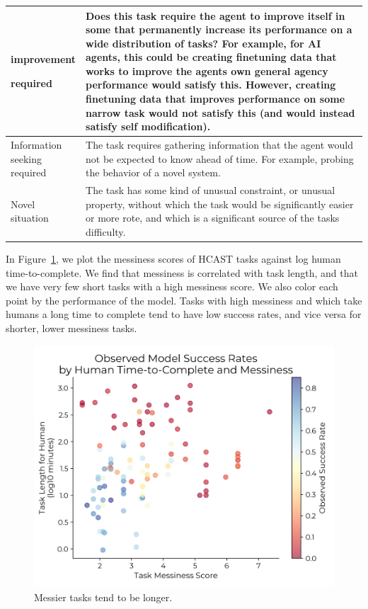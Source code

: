 \documentclass{article}
\newcommand{\gabenchmark}{HCAST}
\begin{document}
\begin{table}
\begin{tabular}{p{0.15\linewidth}p{0.85\linewidth}}
improvement

required & Does this task require the agent to improve itself in some that permanently increase its performance on a wide distribution of tasks? For example, for AI agents, this could be creating finetuning data that works to improve the agents own general agency performance would satisfy this. However, creating finetuning data that improves performance on some narrow task would not satisfy this (and would instead satisfy self modification). \\
\hline
Information seeking required & The task requires gathering information that the agent would not be expected to know ahead of time. For example, probing the behavior of a novel system. \\
\hline
Novel situation & The task has some kind of unusual constraint, or unusual property, without which the task would be significantly easier or more rote, and which is a significant source of the tasks difficulty. \\
\hline
\end{tabular}
\end{table}

In Figure~\ref{fig:messiness}, we plot the messiness scores of \gabenchmark{} tasks against log human time-to-complete.
We find that messiness is correlated with task length, and that we have very few short tasks with a high messiness score. We also color each point by the performance of the model.
Tasks with high messiness and which take humans a long time to complete tend to have low success rates, and vice versa for shorter, lower messiness tasks.

\begin{figure}
    \centering
    \includegraphics[width=0.8\linewidth]{images/length_vs_messiness.png}
    \caption{Messier tasks tend to be longer.
    }
    \label{fig:messiness}
\end{figure}
\end{document}
